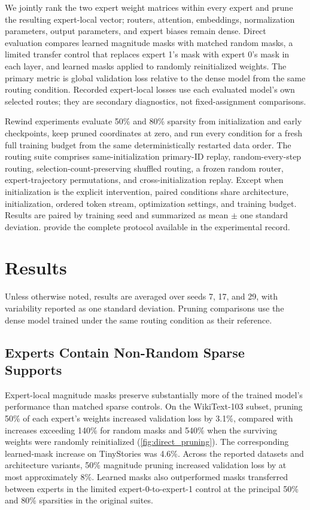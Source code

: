 \documentclass{article}
\begin{document}
We jointly rank the two expert weight matrices within every expert and prune
the resulting expert-local vector; routers, attention, embeddings,
normalization parameters, output parameters, and expert biases remain dense.
Direct evaluation compares learned magnitude masks with matched random masks, a
limited transfer control that replaces expert 1's mask with expert 0's mask in
each layer, and learned masks applied to randomly reinitialized weights. The
primary metric is global validation loss relative to the dense model from the
same routing condition. Recorded expert-local losses use each evaluated
model's own selected routes; they are secondary diagnostics, not
fixed-assignment comparisons.

Rewind experiments evaluate 50\% and 80\% sparsity from initialization and
early checkpoints, keep pruned coordinates at zero, and run every condition for
a fresh full training budget from the same deterministically restarted data
order. The routing suite comprises same-initialization primary-ID replay,
random-every-step routing, selection-count-preserving shuffled routing, a
frozen random router, expert-trajectory permutations, and cross-initialization
replay. Except when initialization is the explicit intervention, paired
conditions share architecture, initialization, ordered token stream,
optimization settings, and training budget. Results are paired by training seed
and summarized as mean $\pm$ one standard deviation.
 provide the complete protocol
available in the experimental record.

\section{Results}
\label{sec:results}

Unless otherwise noted, results are averaged over seeds 7, 17, and 29, with
variability reported as one standard deviation. Pruning comparisons use the
dense model trained under the same routing condition as their reference.

\subsection{Experts Contain Non-Random Sparse Supports}
\label{sec:results_sparse_structure}

Expert-local magnitude masks preserve substantially more of the trained model's
performance than matched sparse controls. On the WikiText-103 subset, pruning 50\% of each
expert's weights increased validation loss by 3.1\%, compared with increases
exceeding 140\% for random masks and 540\% when the surviving weights were
randomly reinitialized (\cref{fig:direct_pruning}). The corresponding
learned-mask increase on TinyStories was 4.6\%. Across the reported datasets and
architecture variants, 50\% magnitude pruning increased validation loss by at
most approximately 8\%. Learned masks also outperformed masks transferred
between experts in the limited expert-0-to-expert-1 control at the principal
50\% and 80\% sparsities in the original suites.
\end{document}
